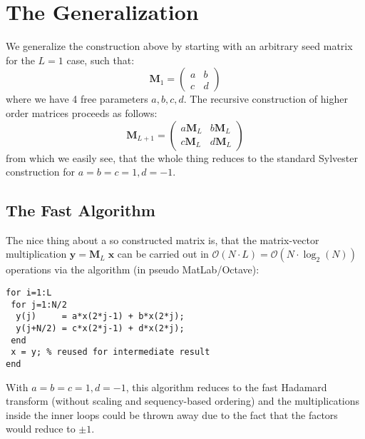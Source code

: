 \section{The Generalization}
We generalize the construction above by starting with an arbitrary seed matrix for the $L=1$ case, such that:
\begin{equation}
 \mathbf{M}_1 =
 \begin{pmatrix}
 a & b  \\
 c & d
 \end{pmatrix}
\end{equation}
where we have 4 free parameters $a, b, c, d$. The recursive construction of higher order matrices proceeds as follows:
\begin{equation}
 \mathbf{M}_{L+1} =
 \begin{pmatrix}
 a \mathbf{M}_L &  b \mathbf{M}_L  \\
 c \mathbf{M}_L &  d \mathbf{M}_L
 \end{pmatrix}
\end{equation}
from which we easily see, that the whole thing reduces to the standard Sylvester construction for $a=b=c=1, d=-1$.

\subsection{The Fast Algorithm}
The nice thing about a so constructed matrix is, that the matrix-vector multiplication $\mathbf{y} = \mathbf{M}_L \; \mathbf{x}$ can be carried out in $\mathcal{O}(N \cdot L) = \mathcal{O}(N \cdot \log_2(N))$ operations via the algorithm (in pseudo MatLab/Octave):
\begin{verbatim}
for i=1:L
 for j=1:N/2
  y(j)     = a*x(2*j-1) + b*x(2*j);
  y(j+N/2) = c*x(2*j-1) + d*x(2*j);  
 end
 x = y; % reused for intermediate result
end
\end{verbatim}
With $a=b=c=1, d=-1$, this algorithm reduces to the fast Hadamard transform (without scaling and sequency-based ordering) and the multiplications inside the inner loops could be thrown away due to the fact that the factors would reduce to $\pm 1$.

